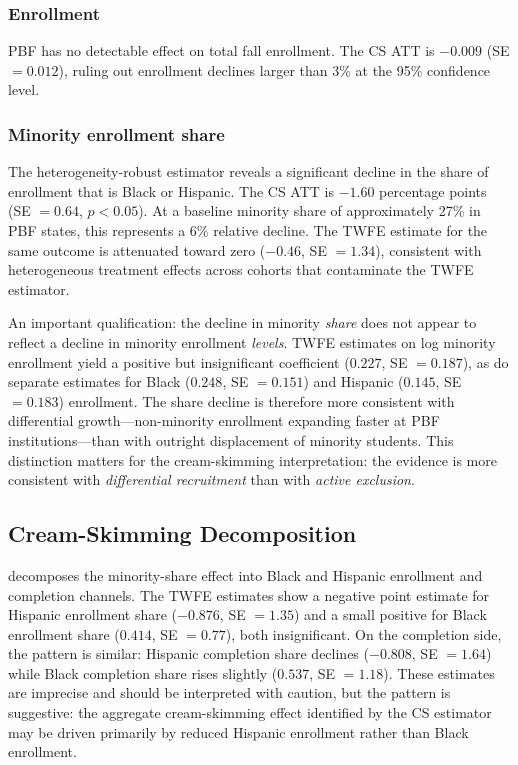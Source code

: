 \documentclass[12pt]{article}
\begin{document}
\subsubsection*{Enrollment} PBF has no detectable effect on total fall enrollment. The CS ATT is $-0.009$ (SE $= 0.012$), ruling out enrollment declines larger than 3\% at the 95\% confidence level.

\subsubsection*{Minority enrollment share} The heterogeneity-robust estimator reveals a significant decline in the share of enrollment that is Black or Hispanic. The CS ATT is $-1.60$ percentage points (SE $= 0.64$, $p < 0.05$). At a baseline minority share of approximately 27\% in PBF states, this represents a 6\% relative decline. The TWFE estimate for the same outcome is attenuated toward zero ($-0.46$, SE $= 1.34$), consistent with heterogeneous treatment effects across cohorts that contaminate the TWFE estimator.

An important qualification: the decline in minority \emph{share} does not appear to reflect a decline in minority enrollment \emph{levels}. TWFE estimates on log minority enrollment yield a positive but insignificant coefficient ($0.227$, SE $= 0.187$), as do separate estimates for Black ($0.248$, SE $= 0.151$) and Hispanic ($0.145$, SE $= 0.183$) enrollment. The share decline is therefore more consistent with differential growth---non-minority enrollment expanding faster at PBF institutions---than with outright displacement of minority students. This distinction matters for the cream-skimming interpretation: the evidence is more consistent with \emph{differential recruitment} than with \emph{active exclusion}.

\subsection{Cream-Skimming Decomposition}



 decomposes the minority-share effect into Black and Hispanic enrollment and completion channels. The TWFE estimates show a negative point estimate for Hispanic enrollment share ($-0.876$, SE $= 1.35$) and a small positive for Black enrollment share ($0.414$, SE $= 0.77$), both insignificant. On the completion side, the pattern is similar: Hispanic completion share declines ($-0.808$, SE $= 1.64$) while Black completion share rises slightly ($0.537$, SE $= 1.18$). These estimates are imprecise and should be interpreted with caution, but the pattern is suggestive: the aggregate cream-skimming effect identified by the CS estimator may be driven primarily by reduced Hispanic enrollment rather than Black enrollment.
\end{document}
